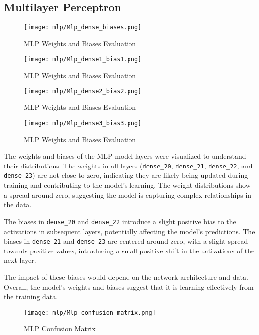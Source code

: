 \subsection{Multilayer Perceptron}\label{mlp_visual}

\begin{figure}[H] 
  \centering
  \texttt{[image: mlp/Mlp\_dense\_biases.png]}
  \caption{MLP Weights and Biases Evaluation}\label{fig:mlp_weights_biases}
\end{figure}

\begin{figure}[H] 
  \centering
  \texttt{[image: mlp/Mlp\_dense1\_bias1.png]}
  \caption{MLP Weights and Biases Evaluation}\label{fig:dense1_bias1}
\end{figure}

\begin{figure}[H] 
  \centering
  \texttt{[image: mlp/Mlp\_dense2\_bias2.png]}
  \caption{MLP Weights and Biases Evaluation}\label{fig:dense2_bias2}
\end{figure}

\begin{figure}[H] 
  \centering
  \texttt{[image: mlp/Mlp\_dense3\_bias3.png]}
  \caption{MLP Weights and Biases Evaluation}\label{fig:dense3_bias3}
\end{figure}

The weights and biases of the MLP model layers were visualized to understand their distributions. The weights in all layers (\texttt{dense\_20}, \texttt{dense\_21}, \texttt{dense\_22}, and \texttt{dense\_23}) are not close to zero, indicating they are likely being updated during training and contributing to the model’s learning. The weight distributions show a spread around zero, suggesting the model is capturing complex relationships in the data.

The biases in \texttt{dense\_20} and \texttt{dense\_22} introduce a slight positive bias to the activations in subsequent layers, potentially affecting the model’s predictions. The biases in \texttt{dense\_21} and \texttt{dense\_23} are centered around zero, with a slight spread towards positive values, introducing a small positive shift in the activations of the next layer.

The impact of these biases would depend on the network architecture and data. Overall, the model’s weights and biases suggest that it is learning effectively from the training data.


\begin{figure}[H] 
  \centering
  \texttt{[image: mlp/Mlp\_confusion\_matrix.png]}
  \caption{MLP Confusion Matrix}\label{fig:mpl_confusion_matrix}
\end{figure}

